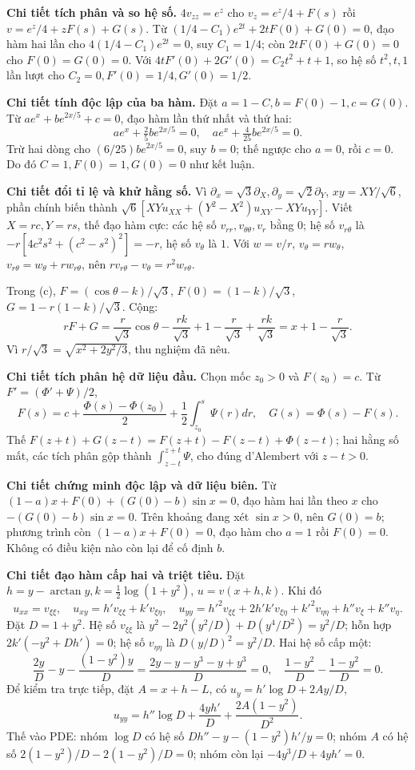 \textbf{Chi tiết tích phân và so hệ số.} $4v_{zz}=e^z$ cho $v_z=e^z/4+F(s)$ rồi $v=e^z/4+zF(s)+G(s)$. Từ $(1/4-C_1)e^{2t}+2tF(0)+G(0)=0$, đạo hàm hai lần cho $4(1/4-C_1)e^{2t}=0$, suy $C_1=1/4$; còn $2tF(0)+G(0)=0$ cho $F(0)=G(0)=0$. Với $4tF'(0)+2G'(0)=C_2t^2+t+1$, so hệ số $t^2,t,1$ lần lượt cho $C_2=0,F'(0)=1/4,G'(0)=1/2$.

\textbf{Chi tiết tính độc lập của ba hàm.} Đặt $a=1-C,b=F(0)-1,c=G(0)$. Từ $ae^x+be^{2x/5}+c=0$, đạo hàm lần thứ nhất và thứ hai:
\[ae^x+\tfrac25be^{2x/5}=0,\quad ae^x+\tfrac4{25}be^{2x/5}=0.\]
Trừ hai dòng cho $(6/25)be^{2x/5}=0$, suy $b=0$; thế ngược cho $a=0$, rồi $c=0$. Do đó $C=1,F(0)=1,G(0)=0$ như kết luận.

\textbf{Chi tiết đổi tỉ lệ và khử hằng số.} Vì $\partial_x=\sqrt3\partial_X,\partial_y=\sqrt2\partial_Y$, $xy=XY/\sqrt6$, phần chính biến thành $\sqrt6[XYu_{XX}+(Y^2-X^2)u_{XY}-XYu_{YY}]$. Viết $X=rc,Y=rs$, thế đạo hàm cực: các hệ số $v_{rr},v_{\theta\theta},v_r$ bằng $0$; hệ số $v_{r\theta}$ là $-r[4c^2s^2+(c^2-s^2)^2]=-r$, hệ số $v_\theta$ là $1$. Với $w=v/r$, $v_\theta=rw_\theta$, $v_{r\theta}=w_\theta+rw_{r\theta}$, nên $rv_{r\theta}-v_\theta=r^2w_{r\theta}$.

Trong (c), $F=(\cos\theta-k)/\sqrt3$, $F(0)=(1-k)/\sqrt3$, $G=1-r(1-k)/\sqrt3$. Cộng:
\[rF+G=\frac r{\sqrt3}\cos\theta-\frac{rk}{\sqrt3}+1-\frac r{\sqrt3}+\frac{rk}{\sqrt3}
=x+1-\frac r{\sqrt3}.\]
Vì $r/\sqrt3=\sqrt{x^2+2y^2/3}$, thu nghiệm đã nêu.

\textbf{Chi tiết tích phân hệ dữ liệu đầu.} Chọn mốc $z_0>0$ và $F(z_0)=c$. Từ $F'=(\Phi'+\Psi)/2$,
\[F(s)=c+\frac{\Phi(s)-\Phi(z_0)}2+\frac12\int_{z_0}^{s}\Psi(r)dr,\quad G(s)=\Phi(s)-F(s).\]
Thế $F(z+t)+G(z-t)=F(z+t)-F(z-t)+\Phi(z-t)$; hai hằng số mất, các tích phân gộp thành $\int_{z-t}^{z+t}\Psi$, cho đúng d'Alembert với $z-t>0$.

\textbf{Chi tiết chứng minh độc lập và dữ liệu biên.} Từ $(1-a)x+F(0)+(G(0)-b)\sin x=0$, đạo hàm hai lần theo $x$ cho $-(G(0)-b)\sin x=0$. Trên khoảng đang xét $\sin x>0$, nên $G(0)=b$; phương trình còn $(1-a)x+F(0)=0$, đạo hàm cho $a=1$ rồi $F(0)=0$. Không có điều kiện nào còn lại để cố định $b$.

\textbf{Chi tiết đạo hàm cấp hai và triệt tiêu.} Đặt $h=y-\arctan y,k=\frac12\log(1+y^2)$, $u=v(x+h,k)$. Khi đó
\[u_{xx}=v_{\xi\xi},\quad u_{xy}=h'v_{\xi\xi}+k'v_{\xi\eta},\quad
u_{yy}=h'^2v_{\xi\xi}+2h'k'v_{\xi\eta}+k'^2v_{\eta\eta}+h''v_\xi+k''v_\eta.\]
Đặt $D=1+y^2$. Hệ số $v_{\xi\xi}$ là $y^2-2y^2(y^2/D)+D(y^4/D^2)=y^2/D$; hỗn hợp $2k'(-y^2+Dh')=0$; hệ số $v_{\eta\eta}$ là $D(y/D)^2=y^2/D$. Hai hệ số cấp một:
\[\frac{2y}D-y-\frac{(1-y^2)y}D
=\frac{2y-y-y^3-y+y^3}D=0,\quad
\frac{1-y^2}D-\frac{1-y^2}D=0.\]
Để kiểm tra trực tiếp, đặt $A=x+h-L$, có $u_y=h'\log D+2Ay/D$,
\[u_{yy}=h''\log D+\frac{4yh'}D+\frac{2A(1-y^2)}{D^2}.\]
Thế vào PDE: nhóm $\log D$ có hệ số $Dh''-y-(1-y^2)h'/y=0$; nhóm $A$ có hệ số $2(1-y^2)/D-2(1-y^2)/D=0$; nhóm còn lại $-4y^3/D+4yh'=0$.
